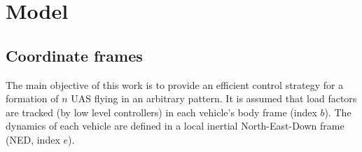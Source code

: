 \documentclass{ifacconf}
\begin{document}
\section{Model}
\label{sec:model}
\subsection{Coordinate frames}
The main objective of this work is to provide an efficient control strategy for a formation of $n$ UAS flying in an arbitrary pattern. It is assumed that load factors are tracked (by low level controllers) in each vehicle's body frame (index $b$). 
The dynamics of each vehicle are defined in a local inertial North-East-Down frame (NED, index $e$). 

\end{document}
